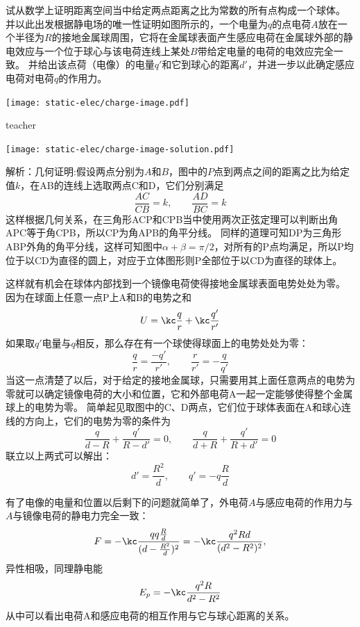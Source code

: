 \begin{example}
试从数学上证明距离空间当中给定两点距离之比为常数的所有点构成一个球体。
并以此出发根据静电场的唯一性证明如图所示的，一个电量为$q$的点电荷$A$放在一个半径为$R$的接地金属球周围，它将在金属球表面产生感应电荷在金属球外部的静电效应与一个位于球心与该电荷连线上某处$B$带给定电量的电荷的电效应完全一致。
并给出该点荷（电像）的电量$q'$和它到球心的距离$d'$，并进一步以此确定感应电荷对电荷$q$的作用力。
\begin{flushright}
\texttt{[image: static-elec/charge-image.pdf]} 
\end{flushright}


\begin{taggedblock}{teacher}


\texttt{[image: static-elec/charge-image-solution.pdf]} 

解析：几何证明:假设两点分别为$A$和$B$，图中的$P$点到两点之间的距离之比为给定值$k$，在AB的连线上选取两点C和D，它们分别满足
\[
\frac{AC}{CB}=k,\qquad \frac{AD}{BC}=k
\]
这样根据几何关系，在三角形ACP和CPB当中使用两次正弦定理可以判断出角APC等于角CPB，所以CP为角APB的角平分线。
同样的道理可知DP为三角形ABP外角的角平分线，这样可知图中$\alpha+\beta=\pi/2$，对所有的P点均满足，所以P均位于以CD为直径的圆上，对应于立体图形则P全部位于以CD为直径的球体上。

这样就有机会在球体内部找到一个镜像电荷使得接地金属球表面电势处处为零。
因为在球面上任意一点P上A和B的电势之和
\[
U=\kc\frac{q}{r}+\kc\frac{q'}{r'}
\]
如果取$q'$电量与$q$相反，那么存在有一个球使得球面上的电势处处为零：
\[
\frac{q}{r}=\frac{-q'}{r'},\qquad \frac{r}{r'}=-\frac{q}{q'}
\]
当这一点清楚了以后，对于给定的接地金属球，只需要用其上面任意两点的电势为零就可以确定镜像电荷的大小和位置，它和外部电荷A一起一定能够使得整个金属球上的电势为零。
简单起见取图中的C、D两点，它们位于球体表面在A和球心连线的方向上，它们的电势为零的条件为
\[ \frac{q}{d-R}+\frac{q'}{R-d'}=0,\qquad \frac{q}{d+R}+\frac{q'}{R+d'}=0 \]
联立以上两式可以解出：
\[  d'=\frac{R^2}{d},\qquad q' = -q\frac{R}{d} \]

有了电像的电量和位置以后剩下的问题就简单了，外电荷$A$与感应电荷的作用力与$A$与镜像电荷的静电力完全一致：
\[F = -\kc \frac{q q\frac{R}{d}}{(d-\frac{R^2}{d})^2} =-\kc  \frac{q^2 Rd}{(d^2-R^2)^2}, \]
异性相吸，同理静电能
\[E_p = -\kc\frac{q^2R}{d^2-R^2}\]
从中可以看出电荷A和感应电荷的相互作用与它与球心距离的关系。


\end{taggedblock}
\end{example}



